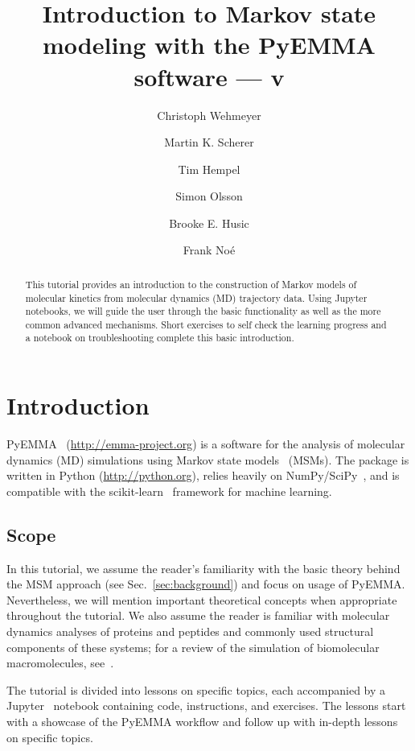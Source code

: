 \documentclass[9pt,tutorial]{livecoms}
\title{Introduction to Markov state modeling with the PyEMMA software --- v\versionnumber}
\author[1\authfn{1}*]{Christoph Wehmeyer}
\author[1\authfn{1}]{Martin K. Scherer}
\author[1\authfn{1}]{Tim Hempel}
\author[1]{Simon Olsson}
\author[2]{Brooke E. Husic}
\author[1*]{Frank Noé}
\affil[1]{Department of Mathematics and Computer Science, Freie Universität Berlin, Arnimallee 6, 14195 Berlin, Germany}
\affil[2]{Department of Chemistry, Stanford University, Stanford, California 94305, USA}
\begin{document}
\begin{frontmatter}
\maketitle

\begin{abstract}
This tutorial provides an introduction to the construction of Markov models of molecular kinetics from molecular dynamics (MD) trajectory data.
Using Jupyter notebooks, we will guide the user through the basic functionality as well as the more common advanced mechanisms.
Short exercises to self check the learning progress and a notebook on troubleshooting complete this basic introduction.
\end{abstract}

\end{frontmatter}

\section{Introduction}

PyEMMA~\cite{pyemma} (\url{http://emma-project.org}) is a software for the analysis of molecular dynamics (MD) simulations using Markov state models~\cite{schuette-msm,singhal-msm-naming} (MSMs).
The package is written in Python (\url{http://python.org}), relies heavily on NumPy/SciPy~\cite{numpy,scipy}, and is compatible with the scikit-learn~\cite{sklearn} framework for machine learning.

\subsection{Scope}

In this tutorial, we assume the reader's familiarity with the basic theory behind the MSM approach (see Sec.~\ref{sec:background}) and focus on usage of PyEMMA.
Nevertheless, we will mention important theoretical concepts when appropriate throughout the tutorial.
We also assume the reader is familiar with molecular dynamics analyses of proteins and peptides and commonly used structural components of these systems; for a review of the simulation of biomolecular macromolecules, see~\cite{dror2012biomolecular}.

The tutorial is divided into lessons on specific topics, each accompanied by a Jupyter~\cite{jupyter} notebook containing code, instructions, and exercises.
The lessons start with a showcase of the PyEMMA workflow and follow up with in-depth lessons on specific topics.
\end{document}
